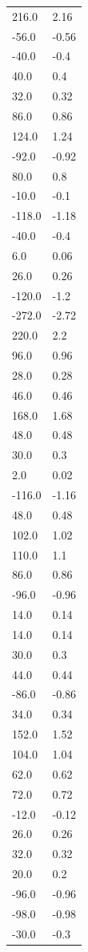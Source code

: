 \begin{longtable}{ll}
216.0 & 2.16 \\
-56.0 & -0.56 \\
-40.0 & -0.4 \\
40.0 & 0.4 \\
32.0 & 0.32 \\
86.0 & 0.86 \\
124.0 & 1.24 \\
-92.0 & -0.92 \\
80.0 & 0.8 \\
-10.0 & -0.1 \\
-118.0 & -1.18 \\
-40.0 & -0.4 \\
6.0 & 0.06 \\
26.0 & 0.26 \\
-120.0 & -1.2 \\
-272.0 & -2.72 \\
220.0 & 2.2 \\
96.0 & 0.96 \\
28.0 & 0.28 \\
46.0 & 0.46 \\
168.0 & 1.68 \\
48.0 & 0.48 \\
30.0 & 0.3 \\
2.0 & 0.02 \\
-116.0 & -1.16 \\
48.0 & 0.48 \\
102.0 & 1.02 \\
110.0 & 1.1 \\
86.0 & 0.86 \\
-96.0 & -0.96 \\
14.0 & 0.14 \\
14.0 & 0.14 \\
30.0 & 0.3 \\
44.0 & 0.44 \\
-86.0 & -0.86 \\
34.0 & 0.34 \\
152.0 & 1.52 \\
104.0 & 1.04 \\
62.0 & 0.62 \\
72.0 & 0.72 \\
-12.0 & -0.12 \\
26.0 & 0.26 \\
32.0 & 0.32 \\
20.0 & 0.2 \\
-96.0 & -0.96 \\
-98.0 & -0.98 \\
-30.0 & -0.3 \\

\end{longtable}
